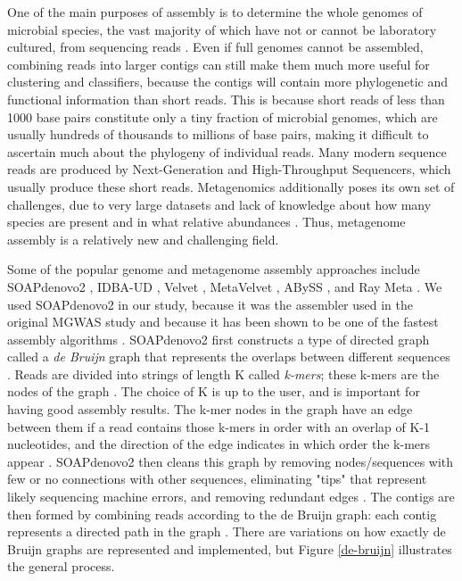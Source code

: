 One of the main purposes of assembly is to determine the whole genomes of microbial species, the vast majority of which have not or cannot be laboratory cultured, from sequencing reads \cite{zerbino08}. Even if full genomes cannot be assembled, combining reads into larger contigs can still make them much more useful for clustering and classifiers, because the contigs will contain more phylogenetic and functional information than short reads. This is because short reads of less than 1000 base pairs constitute only a tiny fraction of microbial genomes, which are usually hundreds of thousands to millions of base pairs, making it difficult to ascertain much about the phylogeny of individual reads. Many modern sequence reads are produced by Next-Generation and High-Throughput Sequencers, which usually produce these short reads. Metagenomics additionally poses its own set of challenges, due to very large datasets and lack of knowledge about how many species are present and in what relative abundances \cite{namiki12}. Thus, metagenome assembly is a relatively new and challenging field.

Some of the popular genome and metagenome assembly approaches include SOAPdenovo2 \cite{luo12}, IDBA-UD \cite{peng12}, Velvet \cite{zerbino08}, MetaVelvet \cite{namiki12}, ABySS \cite{simpson09}, and Ray Meta \cite{boisvert12}. We used SOAPdenovo2 in our study, because it was the assembler used in the original MGWAS study \cite{qin041012} and because it has been shown to be one of the fastest assembly algorithms \cite{peng12}. SOAPdenovo2 first constructs a type of directed graph called a \emph{de Bruijn} graph that represents the overlaps between different sequences \cite{li10}. Reads are divided into strings of length K called \emph{k-mers}; these k-mers are the nodes of the graph \cite{zerbino08}. The choice of K is up to the user, and is important for having good assembly results. The k-mer nodes in the graph have an edge between them if a read contains those k-mers in order with an overlap of K-1 nucleotides, and the direction of the edge indicates in which order the k-mers appear \cite{zerbino08}. SOAPdenovo2 then cleans this graph by removing nodes/sequences with few or no connections with other sequences, eliminating "tips" that represent likely sequencing machine errors, and removing redundant edges \cite{li10}. The contigs are then formed by combining reads according to the de Bruijn graph: each contig represents a directed path in the graph \cite{zerbino08}. There are variations on how exactly de Bruijn graphs are represented and implemented, but Figure \ref{de-bruijn} illustrates the general process.

